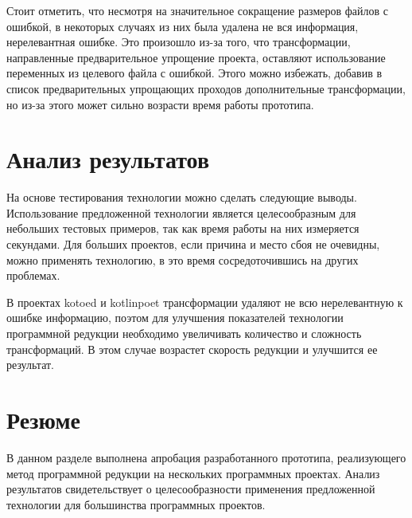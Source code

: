 Стоит отметить, что несмотря на значительное сокращение размеров файлов с ошибкой, в некоторых случаях из них была удалена не вся информация, нерелевантная ошибке. Это произошло из-за того, что трансформации, направленные предварительное упрощение проекта, оставляют использование переменных из целевого файла с ошибкой. Этого можно избежать, добавив в список предварительных упрощающих проходов дополнительные трансформации, но из-за этого может сильно возрасти время работы прототипа.


\section{Анализ результатов}
На основе тестирования технологии можно сделать следующие выводы. Использование предложенной технологии является целесообразным для небольших тестовых примеров, так как время работы на них измеряется секундами. Для больших проектов, если причина и место сбоя не очевидны, можно применять технологию, в это время сосредоточившись на других проблемах.

В проектах kotoed и kotlinpoet трансформации удаляют не всю нерелевантную к ошибке информацию, поэтом для улучшения показателей технологии программной редукции необходимо увеличивать количество и сложность трансформаций. В этом случае возрастет скорость редукции и улучшится ее результат.

\section{Резюме}
В данном разделе выполнена апробация разработанного прототипа, реализующего метод программной редукции на нескольких программных проектах.
Анализ результатов свидетельствует о целесообразности применения предложенной технологии для большинства программных проектов.